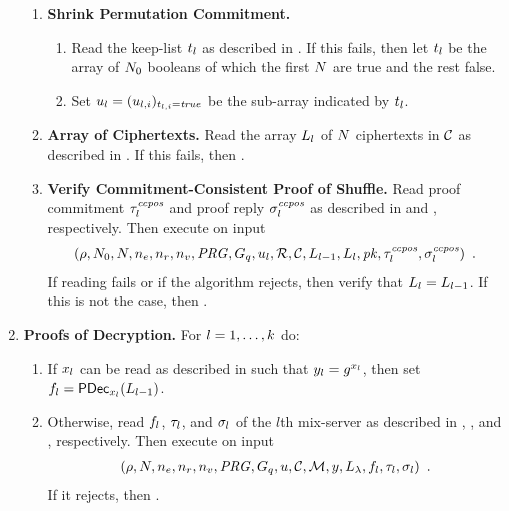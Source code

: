 \documentclass[11pt]{article}
\begin{document}
\begin{enumerate}
\begin{enumerate}
  \item\textbf{Shrink Permutation Commitment.} 
    \begin{enumerate}

    \item Read the keep-list $t_{l}$ as described in
      . If this fails, then let $t_{l}$ be the
      array of $N_{0}$ booleans of which the first $N$ are true and
      the rest false.

    \item Set
      $u_{l}=(u_{l,i})_{t_{l,i}=\mathit{true}}$
      be the sub-array indicated by $t_{l}$.

    \end{enumerate}

  \item\textbf{Array of Ciphertexts.} Read the array $L_{l}$ of
    $N$ ciphertexts in $\mathcal{C}$ as described in . If
    this fails, then \reject.

  \item\textbf{Verify Commitment-Consistent Proof of Shuffle.} Read
    proof commitment $\tau_{l}^{\mathit{ccpos}}$ and proof reply
    $\sigma_{l}^{\mathit{ccpos}}$ as described in  and
    , respectively. Then execute  on input
    \begin{align*}
      (\rho,N_{0},N,{n_e},n_r,n_v,\mathit{PRG},G_{q},u_{l},\mathcal{R},\mathcal{C},L_{l-1},L_{l},\mathit{pk},\tau_{l}^{\mathit{ccpos}},\sigma_{l}^{\mathit{ccpos}})\enspace.
    \end{align*}
    If reading fails or if the algorithm rejects, then verify that
    $L_{l}=L_{l-1}$. If this is not the case, then \reject.

  \end{enumerate}

\item\textbf{Proofs of Decryption.} For $l=1,\ldots,k$ do:
  \begin{enumerate}

  \item If $x_{l}$ can be read as described in  such that
    $y_{l}=g^{x_{l}}$, then set
    $f_{l}=\textsf{PDec}_{x_{l}}(L_{l-1})$.

  \item Otherwise, read $f_{l}$, $\tau_{l}$, and
    $\sigma_{l}$ of the $l$th mix-server as described in ,
    , and , respectively. Then execute
     on input
    \begin{align*}
      (\rho,N,{n_e},n_r,n_v,\mathit{PRG},G_{q},u,\mathcal{C},\mathcal{M},y,L_{\lambda},f_{l},\tau_{l},\sigma_{l})\enspace.
    \end{align*}
    If it rejects, then \reject.


\end{enumerate}
\end{enumerate}
\end{document}
